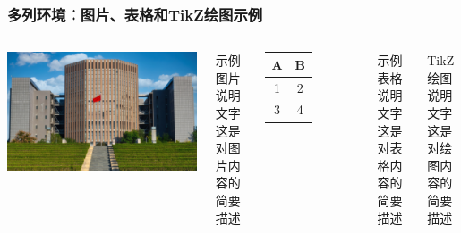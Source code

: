 \begin{frame}
\frametitle{多列环境：图片、表格和TikZ绘图示例}
\begin{columns}[T]
\centering
\includegraphics[width=0.7\linewidth]{src/example_ahu.jpg}

\vspace{1em}

\parbox[t]{\linewidth}{
\raggedright
示例图片说明文字\\
这是对图片内容的简要描述
}

\centering
\begin{tabular}{|c|c|}
\hline
A & B \\
\hline
1 & 2 \\
3 & 4 \\
\hline
\end{tabular}

\vspace{1em}

\parbox[t]{\linewidth}{
\raggedright
示例表格说明文字\\
这是对表格内容的简要描述
}

\centering
{}

\vspace{1em}

\parbox[t]{\linewidth}{
\raggedright
TikZ绘图说明文字\\
这是对绘图内容的简要描述
}
\end{columns}
\end{frame}